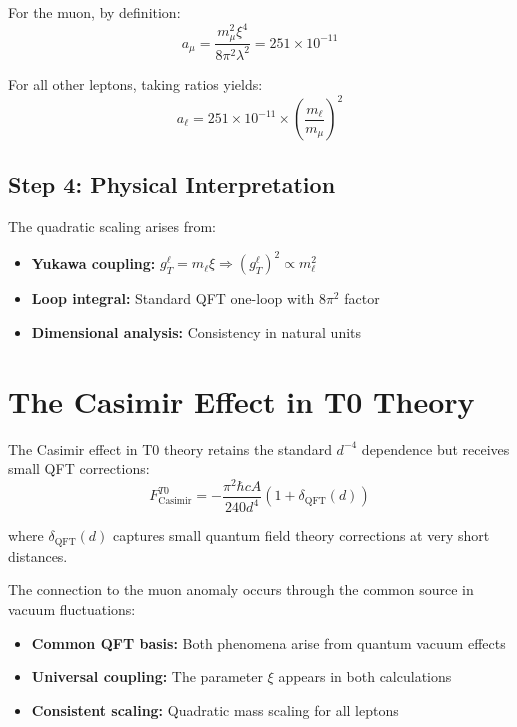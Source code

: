 \documentclass[12pt,a4paper]{article}
\begin{document}
	For the muon, by definition:
	\begin{equation}
		a_\mu = \frac{m_\mu^2 \xi^4}{8\pi^2 \lambda^2} = 251 \times 10^{-11}
	\end{equation}
	
	For all other leptons, taking ratios yields:
	\begin{equation}
		\boxed{a_\ell = 251 \times 10^{-11} \times \left(\frac{m_\ell}{m_\mu}\right)^2}
	\end{equation}
	
	\subsection{Step 4: Physical Interpretation}
	
	The quadratic scaling arises from:
	\begin{itemize}
		\item \textbf{Yukawa coupling:} $g_T^\ell = m_\ell \xi \Rightarrow (g_T^\ell)^2 \propto m_\ell^2$
		\item \textbf{Loop integral:} Standard QFT one-loop with $8\pi^2$ factor
		\item \textbf{Dimensional analysis:} Consistency in natural units
	\end{itemize}
	
	\section{The Casimir Effect in T0 Theory}
	
	The Casimir effect in T0 theory retains the standard $d^{-4}$ dependence but receives small QFT corrections:
	\begin{equation}
		F_{\text{Casimir}}^{T0} = -\frac{\pi^2 \hbar c A}{240 d^{4}} \left(1 + \delta_{\text{QFT}}(d)\right)
	\end{equation}
	
	where $\delta_{\text{QFT}}(d)$ captures small quantum field theory corrections at very short distances.
	
	The connection to the muon anomaly occurs through the common source in vacuum fluctuations:
	\begin{itemize}
		\item \textbf{Common QFT basis:} Both phenomena arise from quantum vacuum effects
		\item \textbf{Universal coupling:} The parameter $\xi$ appears in both calculations
		\item \textbf{Consistent scaling:} Quadratic mass scaling for all leptons
	\end{itemize}
	
\end{document}
